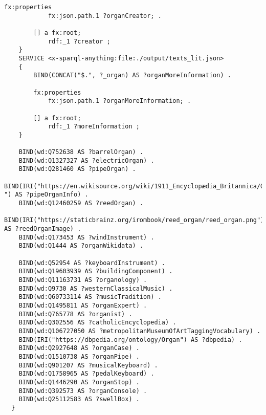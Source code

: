 \begin{lstlisting}[caption={organ-details.sparql}]
		fx:properties
			fx:json.path.1 ?organCreator; .

		[] a fx:root; 
			rdf:_1 ?creator ; 
	} 
	SERVICE <x-sparql-anything:file:./output/texts_lit.json> 
	{
		BIND(CONCAT("$.", ?_organ) AS ?organMoreInformation) .

		fx:properties
			fx:json.path.1 ?organMoreInformation; .

		[] a fx:root; 
			rdf:_1 ?moreInformation ; 
	}

	BIND(wd:Q752638 AS ?barrelOrgan) .
	BIND(wd:Q1327327 AS ?electricOrgan) .
	BIND(wd:Q281460 AS ?pipeOrgan) .
	BIND(IRI("https://en.wikisource.org/wiki/1911_Encyclopædia_Britannica/Organ ") AS ?pipeOrganInfo) .
	BIND(wd:Q12460259 AS ?reedOrgan) .
	BIND(IRI("https://staticbrainz.org/irombook/reed_organ/reed_organ.png") AS ?reedOrganImage) . 
	BIND(wd:Q173453 AS ?windInstrument) .
	BIND(wd:Q1444 AS ?organWikidata) .

	BIND(wd:Q52954 AS ?keyboardInstrument) .
	BIND(wd:Q19603939 AS ?buildingComponent) .
	BIND(wd:Q11163731 AS ?organology) .
	BIND(wd:Q9730 AS ?westernClassicalMusic) .
	BIND(wd:Q60733114 AS ?musicTradition) .
	BIND(wd:Q1495811 AS ?organExpert) .
	BIND(wd:Q765778 AS ?organist) .
	BIND(wd:Q302556 AS ?catholicEncyclopedia) .
	BIND(wd:Q106727050 AS ?metropolitanMuseumOfArtTaggingVocabulary) .
	BIND(IRI("https://dbpedia.org/ontology/Organ") AS ?dbpedia) .
	BIND(wd:Q2927648 AS ?organCase) .
	BIND(wd:Q1510738 AS ?organPipe) .
	BIND(wd:Q901207 AS ?musicalKeyboard) .
	BIND(wd:Q1758965 AS ?pedalKeyboard) .
	BIND(wd:Q1446290 AS ?organStop) .
	BIND(wd:Q392573 AS ?organConsole) .
	BIND(wd:Q25112583 AS ?swellBox) .
  }
\end{lstlisting}
